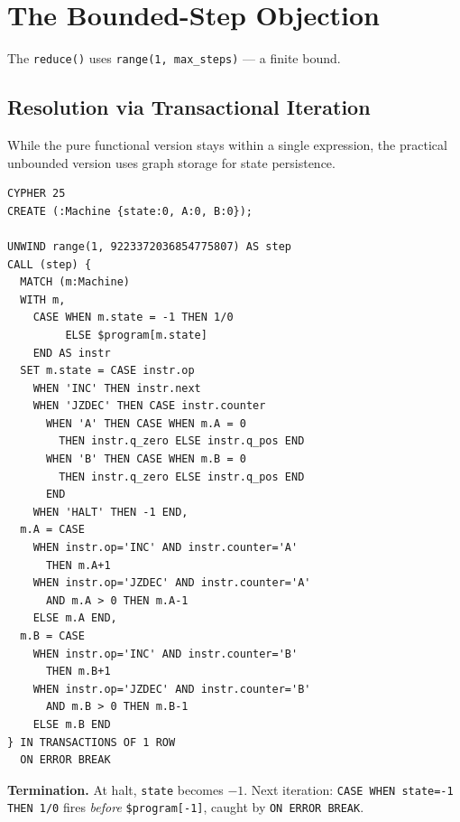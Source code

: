 \documentclass[sigconf, anonymous, review, nonacm]{acmart}
\begin{document}
\section{The Bounded-Step Objection}

The \texttt{reduce()} uses \texttt{range(1, max\_steps)} ---
a finite bound.

\subsection{Resolution via Transactional Iteration}

While the pure functional version stays within a single expression,
the practical unbounded version uses graph storage for state persistence.

\begin{codeblock}
\begin{lstlisting}[style=cypher]
CYPHER 25
CREATE (:Machine {state:0, A:0, B:0});

UNWIND range(1, 9223372036854775807) AS step
CALL (step) {
  MATCH (m:Machine)
  WITH m,
    CASE WHEN m.state = -1 THEN 1/0
         ELSE $program[m.state]
    END AS instr
  SET m.state = CASE instr.op
    WHEN 'INC' THEN instr.next
    WHEN 'JZDEC' THEN CASE instr.counter
      WHEN 'A' THEN CASE WHEN m.A = 0
        THEN instr.q_zero ELSE instr.q_pos END
      WHEN 'B' THEN CASE WHEN m.B = 0
        THEN instr.q_zero ELSE instr.q_pos END
      END
    WHEN 'HALT' THEN -1 END,
  m.A = CASE
    WHEN instr.op='INC' AND instr.counter='A'
      THEN m.A+1
    WHEN instr.op='JZDEC' AND instr.counter='A'
      AND m.A > 0 THEN m.A-1
    ELSE m.A END,
  m.B = CASE
    WHEN instr.op='INC' AND instr.counter='B'
      THEN m.B+1
    WHEN instr.op='JZDEC' AND instr.counter='B'
      AND m.B > 0 THEN m.B-1
    ELSE m.B END
} IN TRANSACTIONS OF 1 ROW
  ON ERROR BREAK
\end{lstlisting}
\end{codeblock}

\textbf{Termination.} At halt, \texttt{state} becomes $-1$.
Next iteration: \texttt{CASE WHEN state=-1 THEN 1/0} fires
\emph{before} \texttt{\$program[-1]}, caught by \texttt{ON ERROR BREAK}.
\end{document}
